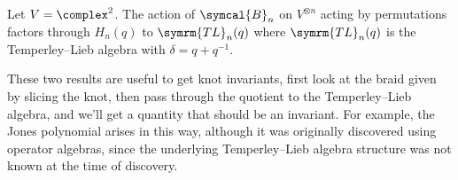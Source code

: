 \documentclass[fleqn]{NotesClass}
\newcommand{\braid}{\symcal{B}}
\newcommand{\temperleyLieb}{\symrm{TL}}
\begin{document}
    \begin{lma}{}{}
        Let \(V = \complex^2\).
        The action of \(\braid_n\) on \(V^{\otimes n}\) acting by permutations factors through \(H_n(q)\) to \(\temperleyLieb_n(q)\) where \(\temperleyLieb_n(q)\) is the Temperley--Lieb algebra with \(\delta = q + q^{-1}\).
    \end{lma}
    
    These two results are useful to get knot invariants, first look at the braid given by slicing the knot, then pass through the quotient to the Temperley--Lieb algebra, and we'll get a quantity that should be an invariant.
    For example, the Jones polynomial arises in this way, although it was originally discovered using operator algebras, since the underlying Temperley--Lieb algebra structure was not known at the time of discovery.
    
    
    
%	    

    \backmatter
    \renewcommand{\glossaryname}{Acronyms}
    \printglossary[acronym]
    \printindex
\end{document}
